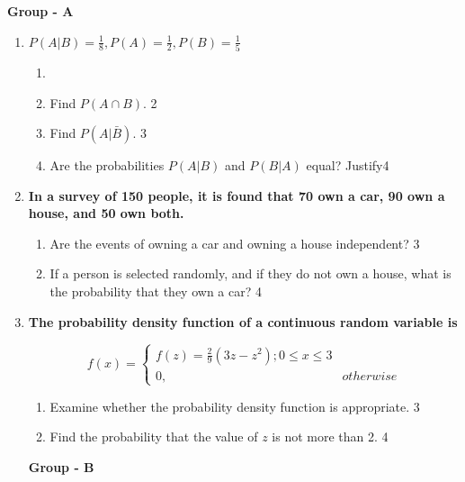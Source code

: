 \documentclass[12pt]{article}
\begin{document}
\begin{center}
\textbf{Group  - A}
\end{center}
 \begin{enumerate}

   \item
  \textbf{$P(A\vert B) = \frac 1 8, P(A) = \frac 12, P(B) = \frac 15$}
 
  \begin{enumerate}
    \item
    \item
    	Find $P(A\cap B)$.  \hfill 2
    \item
    	Find $P(A\vert \bar B)$. \hfill 3
     \item
     	Are the probabilities $P(A\vert B)$ and $P(B\vert A)$ equal? Justify\hfill 4
  \end{enumerate}


\item  
  \textbf{In a survey of 150 people, it is found that 70 own a car, 90 own a house, and 50 own both.}  

  \begin{enumerate}  
    \item  
    	Are the events of owning a car and owning a house independent?  \hfill 3  
    \item  
    	If a person is selected randomly, and if they do not own a house, what is the probability that they own a car? \hfill 4  
  \end{enumerate}  
  
  

   \item
  \textbf{The probability density function of a continuous random variable is}

$$
  f(x) =
\begin{cases}
f(z) = \frac29 (3z-z^2); 0 \le x \le 3 \\
0, & otherwise
\end{cases}
$$
  
  \begin{enumerate}
    \item  
	Examine whether the probability density function is appropriate. \hfill 3
    \item
	Find the probability that the value of $z$ is not more than 2. \hfill 4
  \end{enumerate}
  



  
  \begin{center}
\textbf{Group  - B}
\end{center}


\end{enumerate}
\end{document}
